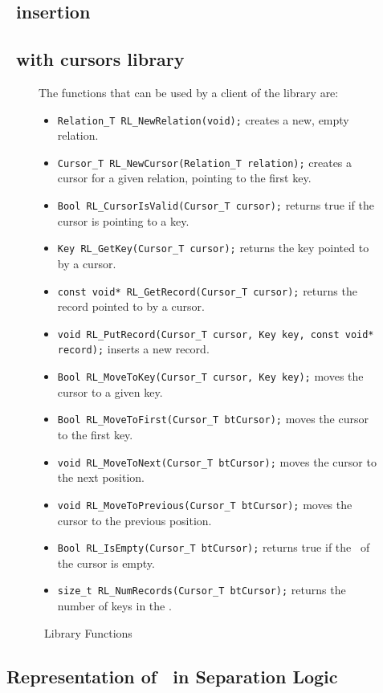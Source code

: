 \subsection{\btree\ insertion}
\afterinsert
\newpage
\subsection{\btrees\ with cursors library}

\begin{figure}
  The functions that can be used by a client of the library are:
  \begin{itemize}
  \item \lstinline{Relation_T RL_NewRelation(void);}  creates a new, empty relation.
  \item \lstinline{Cursor_T RL_NewCursor(Relation_T relation);}  creates a cursor for a given relation, pointing to the first key.
  \item \lstinline{Bool RL_CursorIsValid(Cursor_T cursor);}  returns true if the cursor is pointing to a key.
  \item \lstinline{Key RL_GetKey(Cursor_T cursor);}  returns the key pointed to by a cursor.
  \item \lstinline{const void* RL_GetRecord(Cursor_T cursor);}  returns the record pointed to by a cursor.
  \item \lstinline{void RL_PutRecord(Cursor_T cursor, Key key, const void* record);}  inserts a new record.
  \item \lstinline{Bool RL_MoveToKey(Cursor_T cursor, Key key);}  moves the cursor to a given key.
  \item \lstinline{Bool RL_MoveToFirst(Cursor_T btCursor);}  moves the cursor to the first key.
  \item \lstinline{void RL_MoveToNext(Cursor_T btCursor);}  moves the cursor to the next position.
  \item \lstinline{void RL_MoveToPrevious(Cursor_T btCursor);}  moves the cursor to the previous position.
  \item \lstinline{Bool RL_IsEmpty(Cursor_T btCursor);}  returns true if the \btree\ of the cursor is empty.
  \item \lstinline{size_t RL_NumRecords(Cursor_T btCursor);}  returns the number of keys in the \btree.
  \end{itemize}
  \caption{\btrees\ Library Functions}
  \label{header}
\end{figure}
\newpage
\subsection{Representation of \btrees\ in Separation Logic}


